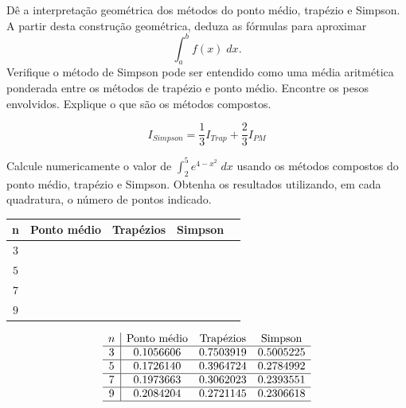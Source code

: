 \begin{exer}
 Dê a interpretação geométrica dos métodos do ponto médio, trapézio e Simpson. A partir desta construção geométrica, deduza as fórmulas para aproximar
 \begin{equation} \int_a^bf(x)\;dx. \end{equation}
 Verifique o método de Simpson pode ser entendido como uma média aritmética ponderada entre os métodos de trapézio e ponto médio. Encontre os pesos envolvidos. Explique o que são os métodos compostos.
 \end{exer}
\begin{resp}
\begin{equation}  
  I_{Simpson}= \frac{1}{3} I_{Trap}+ \frac{2}{3}I_{PM} 
\end{equation}
\end{resp}


\begin{exer}
Calcule numericamente o valor de $\int_2^5e^{4-x^2}\;dx$ usando os métodos compostos do ponto médio, trapézio e Simpson. Obtenha os resultados utilizando, em cada quadratura, o número de pontos indicado.
\begin{center}
\begin{tabular}{|c|c|c|c|c|}
\hline
n   & Ponto médio & Trapézios & Simpson \\
\hline
$3$ &~\hspace{40pt}~& ~\hspace{40pt}~& ~\hspace{40pt}\\
\hline
$5 $ & & & \\
\hline
$7 $ & & &\\
\hline
$9$  & & &\\
\hline
\end{tabular}
\end{center}
\end{exer}
\begin{resp}
    \begin{equation}
    \begin{array}{c|cccc}
        n   & \text{Ponto médio} & \text{Trapézios} & \text{Simpson} \\  \hline
        3 & 0.1056606  &  0.7503919  &  0.5005225  \\  \hline
        5 & 0.1726140 &   0.3964724  &  0.2784992   \\\hline
        7 & 0.1973663 &   0.3062023  &  0.2393551  \\ \hline
        9  &  0.2084204 &   0.2721145  &  0.2306618  \\ \hline
    \end{array}
    \end{equation}
\end{resp}



